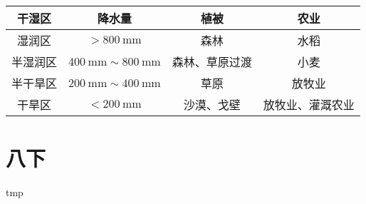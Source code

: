 \documentclass[b5paper,10pt]{book}
\begin{document}
\begin{center}
	\begin{tabular}{|c|c|c|c|}
		\hline
		\textbf{干湿区} & \textbf{降水量} & \textbf{植被} & \textbf{农业}\\
		\hline
		湿润区 & $>\qty{800}{\mm}$ & 森林 & 水稻\\
		\hline
		半湿润区 & $\qty{400}{\mm}\sim\qty{800}{\mm}$ & 森林、草原过渡 & 小麦\\
		\hline
		半干旱区 & $\qty{200}{\mm}\sim\qty{400}{\mm}$ & 草原 & 放牧业\\
		\hline
		干旱区 & $<\qty{200}{\mm}$ & 沙漠、戈壁 & 放牧业、灌溉农业\\
		\hline
	\end{tabular}
\end{center}

\part{八下}
\newpage
tmp
\end{document}
